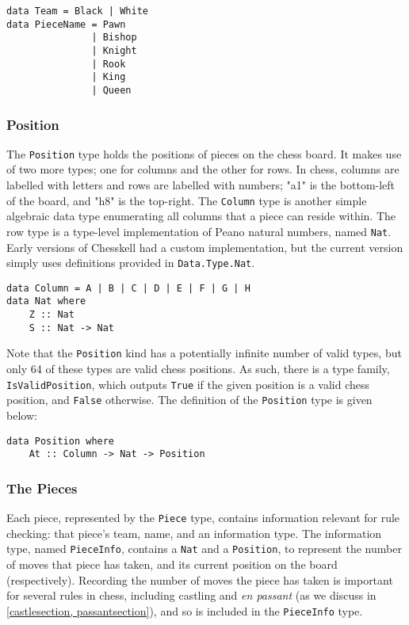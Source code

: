 \documentclass[12pt, a4paper, bibliography=totocnumbered]{scrreprt}
\newcommand{\inline}[1]{\lstinline[basicstyle=\ttfamily\footnotesize]{#1}}
\begin{document}
\begin{lstlisting}
data Team = Black | White
data PieceName = Pawn
               | Bishop
               | Knight
               | Rook
               | King
               | Queen
\end{lstlisting}

\subsubsection{Position}

The \inline{Position} type holds the positions of pieces on the chess board. It makes use of two more types; one for columns and the other for rows. In chess, columns are labelled with letters and rows are labelled with numbers; "a1" is the bottom-left of the board, and "h8" is the top-right. The \inline{Column} type is another simple algebraic data type enumerating all columns that a piece can reside within. The row type is a type-level implementation of Peano natural numbers, named \inline{Nat}. Early versions of Chesskell had a custom implementation, but the current version simply uses definitions provided in \inline{Data.Type.Nat}.

\begin{lstlisting}
data Column = A | B | C | D | E | F | G | H
data Nat where
    Z :: Nat
    S :: Nat -> Nat
\end{lstlisting}

Note that the \inline{Position} kind has a potentially infinite number of valid types, but only 64 of these types are valid chess positions. As such, there is a type family, \inline{IsValidPosition}, which outputs \inline{True} if the given position is a valid chess position, and \inline{False} otherwise. The definition of the \inline{Position} type is given below:

\begin{lstlisting}
data Position where
    At :: Column -> Nat -> Position
\end{lstlisting}

\subsubsection{The Pieces}

Each piece, represented by the \inline{Piece} type, contains information relevant for rule checking: that piece's team, name, and an information type. The information type, named \inline{PieceInfo}, contains a \inline{Nat} and a \inline{Position}, to represent the number of moves that piece has taken, and its current position on the board (respectively). Recording the number of moves the piece has taken is important for several rules in chess, including castling and \textit{en passant} (as we discuss in \cref{castlesection, passantsection}), and so is included in the \inline{PieceInfo} type.
\end{document}
